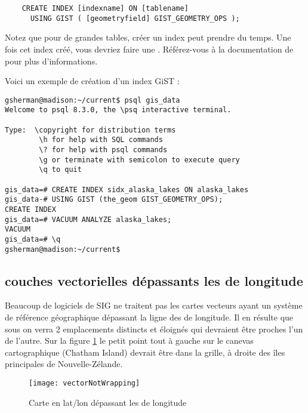 \begin{verbatim}
    CREATE INDEX [indexname] ON [tablename]
      USING GIST ( [geometryfield] GIST_GEOMETRY_OPS );
\end{verbatim}

Notez que pour de grandes tables, créer un index peut prendre du temps. Une fois cet index créé, vous devriez faire une . Référez-vous à la documentation de \cite{PostGISweb} pour plus d'informations.

Voici un exemple de création d'un index GiST :
\begin{verbatim}
gsherman@madison:~/current$ psql gis_data
Welcome to psql 8.3.0, the \psq interactive terminal.

Type:  \copyright for distribution terms
        \h for help with SQL commands
        \? for help with psql commands
        \g or terminate with semicolon to execute query
        \q to quit

gis_data=# CREATE INDEX sidx_alaska_lakes ON alaska_lakes
gis_data-# USING GIST (the_geom GIST_GEOMETRY_OPS);
CREATE INDEX
gis_data=# VACUUM ANALYZE alaska_lakes;
VACUUM
gis_data=# \q
gsherman@madison:~/current$
\end{verbatim}

\subsection{couches vectorielles dépassants les  de longitude}

Beaucoup de logiciels de SIG ne traitent pas les cartes vecteurs  ayant un système de référence géographique dépassant la ligne des  de longitude. Il en résulte que sous \qg on verra 2 emplacements distincts et éloignés qui devraient être proches l'un de l'autre. Sur la figure \ref{fig:vector_not_wrapping} le petit point tout à gauche sur le canevas cartographique (Chatham Island) devrait être dans la grille, à droite des îles principales de Nouvelle-Zélande.

\begin{figure}[ht]
   \begin{center}
   \texttt{[image: vectorNotWrapping]}
   \caption{Carte en lat/lon dépassant les  de longitude \nixcaption}
   \label{fig:vector_not_wrapping}
\end{center}
\end{figure}


